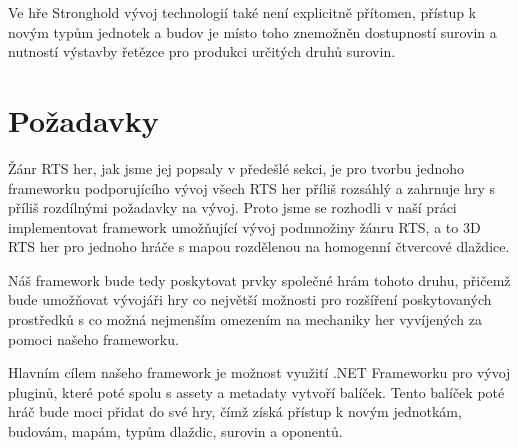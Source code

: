 Ve hře Stronghold vývoj technologií také není explicitně přítomen, přístup k novým typům jednotek a budov je místo toho znemožněn dostupností surovin a nutností výstavby řetězce pro produkci určitých druhů surovin. 

\section{Požadavky}
Žánr RTS her, jak jsme jej popsaly v předešlé sekci, je pro tvorbu jednoho frameworku podporujícího vývoj všech RTS her příliš rozsáhlý a zahrnuje hry s příliš rozdílnými požadavky na vývoj. Proto jsme se rozhodli v naší práci implementovat framework umožňující vývoj podmnožiny žánru RTS, a to 3D RTS her pro jednoho hráče s mapou rozdělenou na homogenní čtvercové dlaždice. 

Náš framework bude tedy poskytovat prvky společné hrám tohoto druhu, přičemž bude umožňovat vývojáři hry co největší možnosti pro rozšíření poskytovaných prostředků s 
co možná nejmenším omezením na mechaniky her vyvíjených za pomoci našeho frameworku.
 
Hlavním cílem našeho framework je možnost využití .NET Frameworku pro vývoj pluginů, které poté spolu s assety a metadaty vytvoří balíček. Tento balíček poté hráč bude moci přidat do své hry, čímž získá přístup k novým jednotkám, budovám, mapám, typům dlaždic, surovin a oponentů. 

